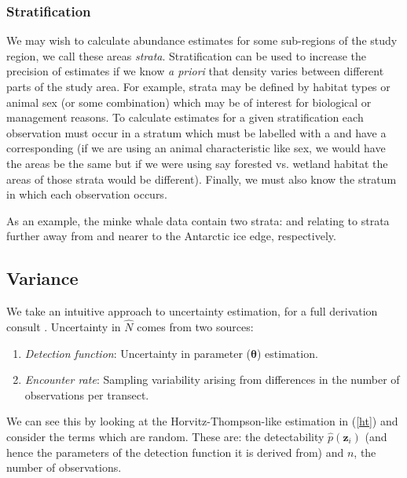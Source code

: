 \documentclass[article]{jss}\usepackage[]{graphicx}\usepackage[]{color}
\begin{document}
\subsubsection{Stratification}

We may wish to calculate abundance estimates for some sub-regions of the study region, we call these areas \textit{strata}. Stratification can be used to increase the precision of estimates if we know \textit{a priori} that density varies between different parts of the study area. For example, strata may be defined by habitat types or animal sex (or some combination) which may be of interest for biological or management reasons. To calculate estimates for a given stratification each observation must occur in a stratum which must be labelled with a  and have a corresponding  (if we are using an animal characteristic like sex, we would have the areas be the same but if we were using say forested vs. wetland habitat the areas of those strata would be different). Finally, we must also know the stratum in which each observation occurs.

As an example, the minke whale data contain two strata:  and  relating to strata further away from and nearer to the Antarctic ice edge, respectively.

\subsection{Variance}

We take an intuitive approach to uncertainty estimation, for a full derivation consult \cite{Marques:2003vb}. Uncertainty in $\hat{N}$ comes from two sources:

\begin{enumerate}
\item \textit{Detection function}: Uncertainty in parameter ($\boldsymbol{\theta}$) estimation.
\item \textit{Encounter rate}: Sampling variability arising from differences in the number of observations per transect.
\end{enumerate}

We can see this by looking at the Horvitz-Thompson-like estimation in (\ref{ht}) and consider the terms which are random. These are: the detectability $\hat{p}(\mathbf{z}_i)$ (and hence the parameters of the detection function it is derived from) and $n$, the number of observations.
\end{document}
